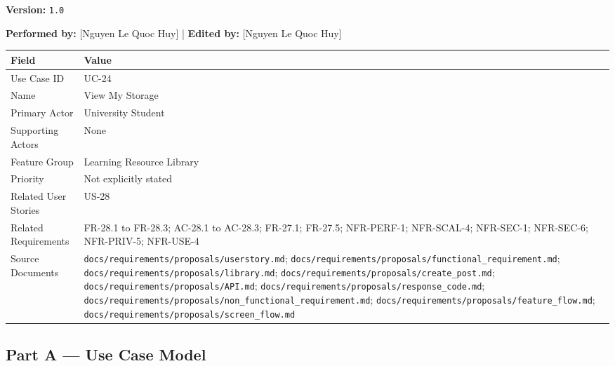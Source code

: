 \documentclass[12pt]{article}
\renewcommand{\baselinestretch}{1.5}
\begin{document}
\textbf{Version:} \texttt{1.0}
\par\medskip

\textbf{Performed by:} [Nguyen Le Quoc Huy] | \textbf{Edited by:} [Nguyen Le Quoc Huy]
\par\medskip

\begingroup
\small
\renewcommand{\baselinestretch}{1.0}\selectfont
\renewcommand{\arraystretch}{1.15}
\setlength{\tabcolsep}{6pt}
\begin{longtable}{|>{\raggedright\arraybackslash}p{}|>{\raggedright\arraybackslash}p{}|}
\hline
\textbf{Field} & \textbf{Value} \\ \hline
\endhead
Use Case ID & UC-24 \\ \hline
Name & View My Storage \\ \hline
Primary Actor & University Student \\ \hline
Supporting Actors & None \\ \hline
Feature Group & Learning Resource Library \\ \hline
Priority & Not explicitly stated \\ \hline
Related User Stories & US-28 \\ \hline
Related Requirements & FR-28.1 to FR-28.3; AC-28.1 to AC-28.3; FR-27.1; FR-27.5; NFR-PERF-1; NFR-SCAL-4; NFR-SEC-1; NFR-SEC-6; NFR-PRIV-5; NFR-USE-4 \\ \hline
Source Documents & \texttt{docs/requirements/proposals/userstory.md}; \texttt{docs/requirements/proposals/functional\_requirement.md}; \texttt{docs/requirements/proposals/library.md}; \texttt{docs/requirements/proposals/create\_post.md}; \texttt{docs/requirements/proposals/API.md}; \texttt{docs/requirements/proposals/response\_code.md}; \texttt{docs/requirements/proposals/non\_functional\_requirement.md}; \texttt{docs/requirements/proposals/feature\_flow.md}; \texttt{docs/requirements/proposals/screen\_flow.md} \\ \hline
\end{longtable}
\endgroup
\par\medskip

\hypertarget{sec:part-a-use-case-model}{}
\subsection*{Part A --- Use Case Model}
\par\medskip

\hypertarget{sec:a1-focused-use-case-diagram}{}
\end{document}
